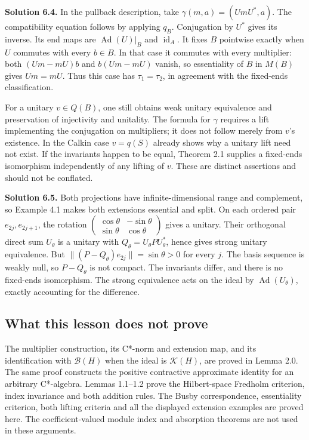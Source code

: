 \documentclass[
  11pt,
]{article}
\begin{document}
\textbf{Solution 6.4.} In the pullback description, take
\(\gamma(m,a)=(UmU^*,a)\). The compatibility equation follows by
applying \(q_B\). Conjugation by \(U^*\) gives its inverse. Its end maps
are \(\operatorname{Ad}(U)|_B\) and \(\operatorname{id}_A\). It fixes
\(B\) pointwise exactly when \(U\) commutes with every \(b\in B\). In
that case it commutes with every multiplier: both \((Um-mU)b\) and
\(b(Um-mU)\) vanish, so essentiality of \(B\) in \(M(B)\) gives
\(Um=mU\). Thus this case has \(\tau_1=\tau_2\), in agreement with the
fixed-ends classification.

For a unitary \(v\in Q(B)\), one still obtains weak unitary equivalence
and preservation of injectivity and unitality. The formula for
\(\gamma\) requires a lift implementing the conjugation on multipliers;
it does not follow merely from \(v\)'s existence. In the Calkin case
\(v=q(S)\) already shows why a unitary lift need not exist. If the
invariants happen to be equal, Theorem 2.1 supplies a fixed-ends
isomorphism independently of any lifting of \(v\). These are distinct
assertions and should not be conflated.

\textbf{Solution 6.5.} Both projections have infinite-dimensional range
and complement, so Example 4.1 makes both extensions essential and
split. On each ordered pair \(e_{2j},e_{2j+1}\), the rotation
\(\begin{pmatrix}\cos\theta&-\sin\theta\\\sin\theta&\cos\theta\end{pmatrix}\)
gives a unitary. Their orthogonal direct sum \(U_\theta\) is a unitary
with \(Q_\theta=U_\theta P U_\theta^*\), hence gives strong unitary
equivalence. But \(\|(P-Q_\theta)e_{2j}\|=\sin\theta>0\) for every
\(j\). The basis sequence is weakly null, so \(P-Q_\theta\) is not
compact. The invariants differ, and there is no fixed-ends isomorphism.
The strong equivalence acts on the ideal by
\(\operatorname{Ad}(U_\theta)\), exactly accounting for the difference.

\subsection{What this lesson does not
prove}\label{what-this-lesson-does-not-prove}

The multiplier construction, its C*-norm and extension map, and its
identification with \(\mathcal B(H)\) when the ideal is
\(\mathcal K(H)\), are proved in Lemma 2.0. The same proof constructs
the positive contractive approximate identity for an arbitrary
C*-algebra. Lemmas 1.1--1.2 prove the Hilbert-space Fredholm criterion,
index invariance and both addition rules. The Busby correspondence,
essentiality criterion, both lifting criteria and all the displayed
extension examples are proved here. The coefficient-valued module index
and absorption theorems are not used in these arguments.
\end{document}
